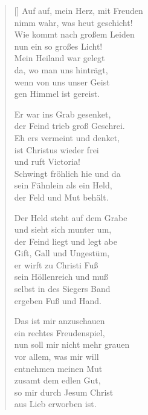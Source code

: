 
\begin{multicols}{2}
\settowidth{\versewidth}{Ich hang und bleib auch hangen}
\begin{verse}[\versewidth]
 Auf auf, mein Herz, mit Freuden\\
nimm wahr, was heut geschicht!\\
Wie kommt nach großem Leiden\\
nun ein so großes Licht!\\
Mein Heiland war gelegt\\
da, wo man uns hinträgt,\\
wenn von uns unser Geist\\
gen Himmel ist gereist.

 Er war ins Grab gesenket,\\
der Feind trieb groß Geschrei.\\
Eh ers vermeint und denket,\\
ist Christus wieder frei\\
und ruft Victoria!\\
Schwingt fröhlich hie und da\\
sein Fähnlein als ein Held,\\
der Feld und Mut behält.

 Der Held steht auf dem Grabe\\
und sieht sich munter um,\\
der Feind liegt und legt abe\\
Gift, Gall und Ungestüm,\\
er wirft zu Christi Fuß\\
sein Höllenreich und muß\\
selbst in des Siegers Band\\
ergeben Fuß und Hand.

 Das ist mir anzuschauen\\
ein rechtes Freudenspiel,\\
nun soll mir nicht mehr grauen\\
vor allem, was mir will\\
entnehmen meinen Mut\\
zusamt dem edlen Gut,\\
so mir durch Jesum Christ\\
aus Lieb erworben ist.


\end{verse}
\end{multicols}
